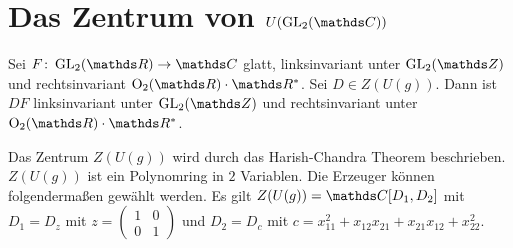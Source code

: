 \chapter{Das Zentrum von $U(\GL_2(\C))$}
\begin{prop}
Sei $F\colon \GL_2(\R) \to \C$ glatt, linksinvariant unter $\GL_2(\Z)$ und rechtsinvariant $\Oo_2(\R) \cdot \R^\ast$.
Sei $D \in Z(U(g))$. Dann ist $DF$ linksinvariant unter $\GL_2(\Z)$ und rechtsinvariant unter $\Oo_2(\R) \cdot \R^\ast$.

\end{prop}
Das Zentrum $Z(U(g))$ wird durch das Harish-Chandra Theorem beschrieben.
$Z(U(g))$ ist ein Polynomring in $2$ Variablen.
Die Erzeuger können folgendermaßen gewählt werden.
Es gilt $Z(U(g))=\C[D_1,D_2]$ mit $D_1=D_z$ mit $z=\begin{pmatrix}
1 &0\\
0 &1
\end{pmatrix}$ und $D_2=D_c$ mit $c=x_{11}^2 +x_{12}x_{21} +x_{21}x_{12} +x_{22}^2$.

